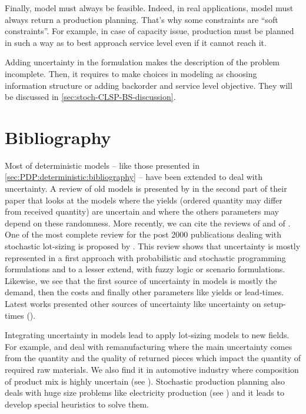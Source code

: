 Finally, model must always be feasible.
Indeed, in real applications, model must always return a production planning.
That's why some constraints are ``soft constraints''.
For example, in case of capacity issue, production must be planned in such a way as to best approach service level even if it cannot reach it.





Adding uncertainty in the formulation makes the description of the problem incomplete.
Then, it requires to make choices in modeling as choosing information structure or adding backorder and service level objective.
They will be discussed in \cref{sec:stoch-CLSP-BS-discussion}.


\section{Bibliography}
\label{sec:PDP:stochastic:bibliography}


Most of deterministic models -- like those presented in \cref{sec:PDP:deterministic:bibliography} -- have been extended to deal with uncertainty.
A review of old models is presented by \citet{Candace1995} in the second part of their paper that looks at the models where the yields (\eg ordered quantity may differ from received quantity) are uncertain and where the others parameters may depend on these randomness.
More recently, we can cite the reviews of \citet{Mula2006} and of \citet{Diaz-Madronero2014}.
One of the most complete review for the post 2000 publications dealing with stochastic lot-sizing is proposed by \citet{Aloulou2014}.
This review shows that uncertainty is mostly represented in a first approach with probabilistic and stochastic programming formulations and to a lesser extend, with fuzzy logic or scenario formulations.
Likewise, we see that the first source of uncertainty in models is mostly the demand, then the costs and finally other parameters like yields or lead-times.
Latest works presented other sources of uncertainty like uncertainty on setup-times (\citet{Tas2018}).


Integrating uncertainty in models lead to apply lot-sizing models to new fields.
For example, \citet{Mukhopadhyay2009} and \citet{Macedo2016} deal with remanufacturing where the main uncertainty comes from the quantity and the quality of returned pieces which impact the quantity of required raw materials.
We also find it in automotive industry where composition of product mix is highly uncertain (see \citet{Gyulai2015}).
Stochastic production planning also deals with huge size problems like electricity production (see \citet{Rozenknop2013}) and it leads to develop special heuristics to solve them.



